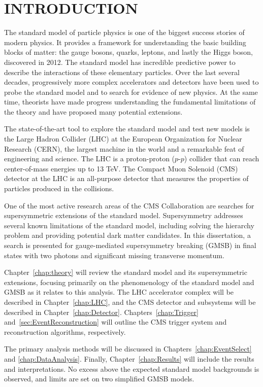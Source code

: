 \chapter{INTRODUCTION}

The standard model of particle physics is one of the biggest success stories of modern physics. It provides a framework for understanding the basic building blocks of matter: the gauge bosons, quarks, leptons, and lastly the Higgs boson, discovered in 2012. The standard model 
has incredible predictive power to describe the interactions of these elementary particles. Over the last several decades, progressively more complex accelerators and detectors have been used to probe the standard model and to search for evidence of new physics. At the same time, theorists have made progress understanding the fundamental limitations of the theory and have proposed many potential extensions.

The state-of-the-art tool to explore the standard model and test new models is the Large Hadron Collider (LHC) at the European Organization for Nuclear Research (CERN), the largest machine in the world and a remarkable feat of engineering and science. The LHC is a proton-proton ($p$-$p$) collider that can reach center-of-mass energies up to 13 TeV. The Compact Muon Solenoid (CMS) detector at the LHC is an all-purpose detector that measures the properties of particles produced in the collisions. 

One of the most active research areas of the CMS Collaboration are searches for supersymmetric extensions of the standard model. Supersymmetry addresses several known limitations of the standard model, 
including solving the hierarchy problem and providing potential dark matter candidates. 
In this dissertation, a search is presented for gauge-mediated supersymmetry breaking (GMSB) 
in final states with two photons and significant missing transverse momentum. 

Chapter~\ref{chap:theory} will review the standard model and its supersymmetric extensions, focusing primarily on the phenomenology of the standard model and GMSB as it relates to this analysis. The LHC accelerator complex will be described in Chapter~\ref{chap:LHC}, and the 
CMS detector and subsystems will be described in Chapter~\ref{chap:Detector}. Chapters~\ref{chap:Trigger} and~\ref{sec:EventReconstruction} will outline the CMS trigger system and reconstruction algorithms, respectively. 

The primary analysis methods will be discussed in Chapters~\ref{chap:EventSelect} and \ref{chap:DataAnalysis}.
Finally, Chapter~\ref{chap:Results} will include the results and interpretations. No excess above the 
expected standard model backgrounds is observed, and limits are set on two simplified GMSB models.